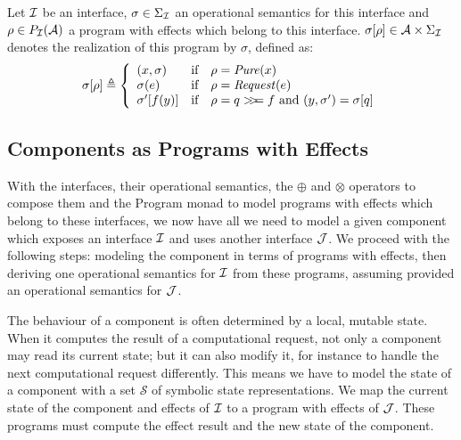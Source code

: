 \begin{definition} \label{def:freespec:realisation} Let $\mathcal{I}$ be an interface,
  $\sigma \in \Sigma_{\mathcal{I}}$ an operational semantics for this interface and
  $\rho \in P_{\mathcal{I}}(\mathcal{A})$ a program with effects which belong to this
  interface.
  $\sigma[\rho] \in \mathcal{A} \times \Sigma_{\mathcal{I}}$ denotes the realization of
  this program by $\sigma$, defined as:
  \[ \sigma[\rho] \triangleq \left\{
      \begin{array}{lcl} (x, \sigma) & \text{if} & \rho =
                                                   \mathit{Pure}(x) \\
        \sigma(e) & \text{if} & \rho =
                                \mathit{Request}(e) \\
        \sigma'[f(y)] & \text{if} & \rho =
                                    q >\!\!>\!\!= f\text{ and }(y, \sigma') = \sigma[q] \\
      \end{array}
    \right.
  \]
\end{definition}

\subsection{Components as Programs with Effects}

With the interfaces, their operational semantics, the $\oplus$ and $\otimes$
operators to compose them and the Program monad to model programs with effects
which belong to these interfaces, we now have all we need to model a given
component which exposes an interface $\mathcal{I}$ and uses another interface $\mathcal{J}$.
%
We proceed with the following steps: modeling the component in terms of programs
with effects, then deriving one operational semantics for $\mathcal{I}$ from these
programs, assuming provided an operational semantics for $\mathcal{J}$.

The behaviour of a component is often determined by a local, mutable state.
%
When it computes the result of a computational request, not only a component may
read its current state; but it can also modify it, for instance to handle the
next computational request differently.
%
This means we have to model the state of a component with a set $\mathcal{S}$ of
symbolic state representations.
%
We map the current state of the component and effects of $\mathcal{I}$ to a program with
effects of $\mathcal{J}$.
%
These programs must compute the effect result and the new state of the
component.

